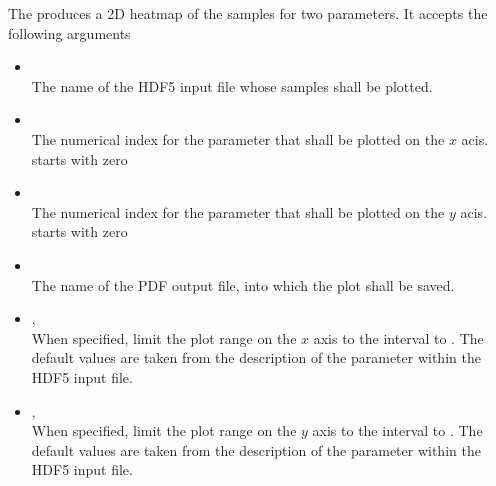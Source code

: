 The  produces a 2D heatmap of the samples for two parameters.
It accepts the following arguments
\begin{itemize}
    \item[] \\[\medskipamount]
        The name of the HDF5 input file whose samples shall be plotted.

    \item[] \\[\medskipamount]
        The numerical index for the parameter that shall be plotted on the
        $x$ acis.  starts with zero

    \item[] \\[\medskipamount]
        The numerical index for the parameter that shall be plotted on the
        $y$ acis.  starts with zero

    \item[] \\[\medskipamount]
        The name of the PDF output file, into which the plot shall be saved.

    \item[] , \\[\medskipamount]
        When specified, limit the plot range on the $x$ axis to the interval
         to . The default values are taken from the
        description of the parameter within the HDF5 input file.

    \item[] , \\[\medskipamount]
        When specified, limit the plot range on the $y$ axis to the interval
         to . The default values are taken from the
        description of the parameter within the HDF5 input file.
\end{itemize}
